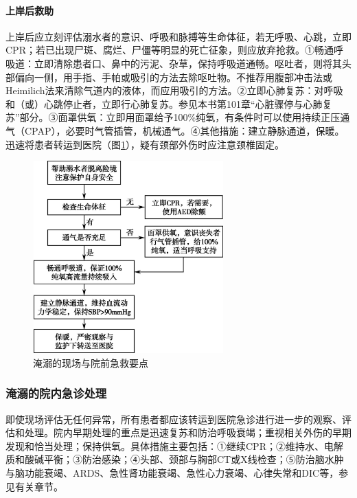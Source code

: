 \paragraph{上岸后救助}

上岸后应立刻评估溺水者的意识、呼吸和脉搏等生命体征，若无呼吸、心跳，立即CPR；若已出现尸斑、腐烂、尸僵等明显的死亡征象，则应放弃抢救。①畅通呼吸道：立即清除患者口、鼻中的污泥、杂草，保持呼吸道通畅。呕吐者，则将其头部偏向一侧，用手指、手帕或吸引的方法去除呕吐物。不推荐用腹部冲击法或Heimilich法来清除气道内的液体，而应用吸引的方法。②立即心肺复苏：对呼吸和（或）心跳停止者，立即行心肺复苏。参见本书第101章“心脏骤停与心肺复苏”部分。③面罩供氧：立即用面罩给予100\%纯氧，有条件时可以使用持续正压通气（CPAP），必要时气管插管，机械通气。④其他措施：建立静脉通道，保暖。迅速将患者转运到医院（图\ref{fig132-1}），疑有颈部外伤时应注意颈椎固定。

\begin{figure}[!htbp]
 \centering
 \includegraphics[width=2.89583in,height=2.91667in]{./images/Image00504.jpg}
 \captionsetup{justification=centering}
 \caption{淹溺的现场与院前急救要点}
 \label{fig132-1}
  \end{figure} 

\subsubsection{淹溺的院内急诊处理}

即使现场评估无任何异常，所有患者都应该转运到医院急诊进行进一步的观察、评估和处理。院内早期处理的重点是迅速复苏和防治呼吸衰竭；重视相关外伤的早期发现和恰当处理；保持供氧。具体措施主要包括：①继续CPR；②维持水、电解质和酸碱平衡；③防治感染；④头部、颈部与胸部CT或X线检查；⑤防治脑水肿与脑功能衰竭、ARDS、急性肾功能衰竭、急性心力衰竭、心律失常和DIC等，参见有关章节。

\protect\hypertarget{text00361.html}{}{}

